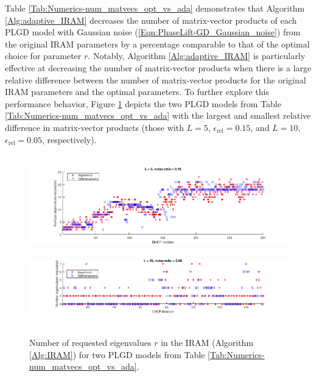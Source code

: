 Table \ref{Tab:Numerics-num_matvecs_opt_vs_ada} demonstrates that Algorithm \ref{Alg:adaptive_IRAM} decreases the number of matrix-vector products of each PLGD model with Gaussian noise (\ref{Eqn:PhaseLift-GD_Gaussian_noise}) from the original IRAM parameters by a percentage comparable to that of the optimal choice for parameter $r$.
Notably, Algorithm \ref{Alg:adaptive_IRAM} is particularly effective at decreasing the number of matrix-vector products when there is a large relative difference between the number of matrix-vector products for the original IRAM parameters and the optimal parameters.
To further explore this performance behavior, Figure \ref{Fig:Numerics-num_eigs_ada_vs_opt} depicts the two PLGD models from Table \ref{Tab:Numerics-num_matvecs_opt_vs_ada} with the largest and smallest relative difference in matrix-vector products (those with $L=5$, $\epsilon_\text{rel} = 0.15$, and $L=10$, $\epsilon_\text{rel} = 0.05$, respectively).



\begin{figure}[H]
\centering
\hbox{\hspace{-1.8cm} \includegraphics[scale=0.6]{Numerics-num_eigs_ada_vs_opt_1} }\vspace{0.6cm}
\hbox{\hspace{-1.8cm} \includegraphics[scale=0.6]{Numerics-num_eigs_ada_vs_opt_2} }
\vspace{0.2cm}
	\caption{
	Number of requested eigenvalues $r$ in the IRAM (Algorithm \ref{Alg:IRAM}) for two PLGD models from Table \ref{Tab:Numerics-num_matvecs_opt_vs_ada}.
	}
\label{Fig:Numerics-num_eigs_ada_vs_opt}
\end{figure}


